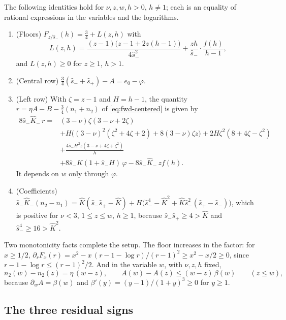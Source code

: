 The following identities hold for $\nu,z,w,h>0$, $h\ne1$; each is an equality of rational
expressions in the variables and the logarithms.
\begin{enumerate}
\item (Floors) $F_{z/\hat s_-}(h)=\frac34+L(z,h)$ with
  \[
  L(z,h)=\frac{(z-1)\bigl(z-1+2z(h-1)\bigr)}{4\hat s_-^2}+\frac{zh}{\hat s_-}\cdot\frac{f(h)}{h-1},
  \]
  and $L(z,h)\ge0$ for $z\ge1$, $h>1$.
\item (Central row) $\frac34(\hat s_-+\hat s_+)-A=e_0-\varphi$.
\item (Left row) With $\zeta=z-1$ and $H=h-1$, the quantity $r=\eta A-B-\frac34(n_1+n_2)$ of
  \eqref{eq:fwd-centered} is given by
  \begin{align*}
  8\hat s_-\hat K_-\,r={}&(3-\nu)\zeta(3-\nu+2\zeta)\\
  &+H\bigl((3-\nu)^2(\zeta^2+4\zeta+2)+8(3-\nu)\zeta z\bigr)
  +2H\zeta^2(8+4\zeta-\zeta^2)\\
  &+\frac{4\hat s_-H^2z(3-\nu+4\zeta+\zeta^2)}{h}\\
  &+8\hat s_-\hat K(1+\hat s_-H)\,\varphi-8\hat s_-\hat K_-\,zf(h).
  \end{align*}
  It depends on $w$ only through $\varphi$.
\item (Coefficients) $\hat s_-\hat K_-(n_2-n_1)=\hat K(\hat s_-\hat s_+-\hat K)
  +H\bigl(\hat s_-^4-\hat K^2+\hat K\hat s_-^2(\hat s_+-\hat s_-)\bigr)$, which is positive for
  $\nu<3$, $1\le z\le w$, $h\ge1$, because $\hat s_-\hat s_+\ge4>\hat K$ and
  $\hat s_-^4\ge16>\hat K^2$.
\end{enumerate}
Two monotonicity facts complete the setup. The floor increases in the factor: for $x\ge1/2$,
$\partial_rF_x(r)=x^2-x\,(r-1-\log r)/(r-1)^2\ge x^2-x/2\ge0$, since
$r-1-\log r\le(r-1)^2/2$. And in the variable $w$, with $\nu,z,h$ fixed,
\[
n_2(w)-n_2(z)=\eta\,(w-z),\qquad A(w)-A(z)\le(w-z)\,\beta(w)\qquad(z\le w),
\]
because $\partial_wA=\beta(w)$ and $\beta'(y)=(y-1)/(1+y)^3\ge0$ for $y\ge1$.

\subsection{The three residual signs}\label{app:fwd-signs}


